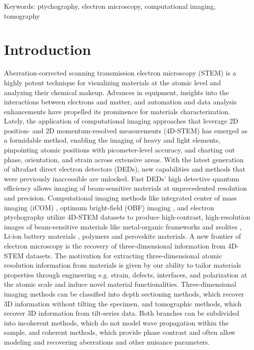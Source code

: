 \documentclass[12pt]{iopart}
\begin{document}
Keywords: ptychography, electron microscopy, computational imaging, tomography
\section{Introduction}
Aberration-corrected scanning transmission electron microscopy (STEM) is a highly potent technique for visualizing materials at the atomic level and analyzing their chemical makeup. Advances in equipment, insights into the interactions between electrons and matter, and automation and data analysis enhancements have propelled its prominence for materials characterization. Lately, the application of computational imaging approaches that leverage 2D position- and 2D momentum-resolved measurements (4D-STEM) has emerged as a formidable method, enabling the imaging of heavy and light elements, pinpointing atomic positions with picometer-level accuracy, and charting out phase, orientation, and strain across extensive areas.
With the latest generation of ultrafast direct electron detectors (DEDs), new capabilities and methods that were previously inaccessible are unlocked. Fast DEDs' high detective quantum efficiency allows imaging of beam-sensitive materials at unprecedented resolution and precision. Computational imaging methods like integrated center of mass imaging (iCOM) \cite{Lazic_Bosch_Lazar_2016}, optimum bright-field (OBF) imaging \cite{Ooe_2023}, and electron ptychography \cite{Yang_2016} utilize 4D-STEM datasets to produce high-contrast, high-resolution images of beam-sensitive materials like metal-organic frameworks and zeolites \cite{Peng_2022, Sha_Cui_Li_Zhang_Yang_Li_Yu_2023}, Li-ion battery materials \cite{Lozano_Martinez_Jin_Nellist_Bruce_2018}, polymers and perovskite materials\cite{Reis_2018}. A new frontier of electron microscopy is the recovery of three-dimensional information from 4D-STEM datasets.  
The motivation for extracting three-dimensional atomic resolution information from materials is given by our ability to tailor materials properties through engineering e.g. strain, defects, interfaces, and polarization at the atomic scale and induce novel material functionalities. 
Three-dimensional imaging methods can be classified into depth sectioning methods, which recover 3D information without tilting the specimen, and tomographic methods, which recover 3D information from tilt-series data. Both branches can be subdivided into incoherent methods, which do not model wave propagation within the sample, and coherent methods, which provide phase contrast and often allow modeling and recovering aberrations and other nuisance parameters. 
\end{document}
